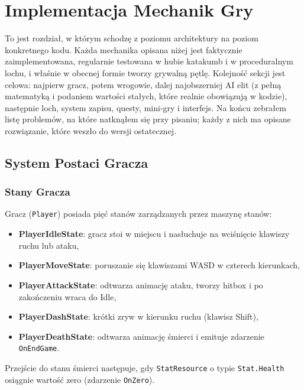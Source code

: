 \chapter{Implementacja Mechanik Gry}
\label{ch:implementacja}

To jest rozdział, w którym schodzę z poziomu architektury na poziom konkretnego kodu. Każda mechanika opisana niżej jest faktycznie zaimplementowana, regularnie testowana w hubie katakumb i w proceduralnym lochu, i właśnie w obecnej formie tworzy grywalną pętlę. Kolejność sekcji jest celowa: najpierw gracz, potem wrogowie, dalej najobszerniej AI elit (z pełną matematyką i podaniem wartości stałych, które realnie obowiązują w kodzie), następnie loch, system zapisu, questy, mini-gry i interfejs. Na końcu zebrałem listę problemów, na które natknąłem się przy pisaniu; każdy z nich ma opisane rozwiązanie, które weszło do wersji ostatecznej.

\section{System Postaci Gracza}

\subsection{Stany Gracza}

Gracz (\texttt{Player}) posiada pięć stanów zarządzanych przez maszynę stanów:

\begin{itemize}
    \item \textbf{PlayerIdleState}: gracz stoi w miejscu i nasłuchuje na wciśnięcie klawiszy ruchu lub ataku,
    \item \textbf{PlayerMoveState}: poruszanie się klawiszami WASD w czterech kierunkach,
    \item \textbf{PlayerAttackState}: odtwarza animację ataku, tworzy hitbox i po zakończeniu wraca do Idle,
    \item \textbf{PlayerDashState}: krótki zryw w kierunku ruchu (klawisz Shift),
    \item \textbf{PlayerDeathState}: odtwarza animację śmierci i emituje zdarzenie \texttt{OnEndGame}.
\end{itemize}

Przejście do stanu śmierci następuje, gdy \texttt{StatResource} o typie \texttt{Stat.Health} osiągnie wartość zero (zdarzenie \texttt{OnZero}).

